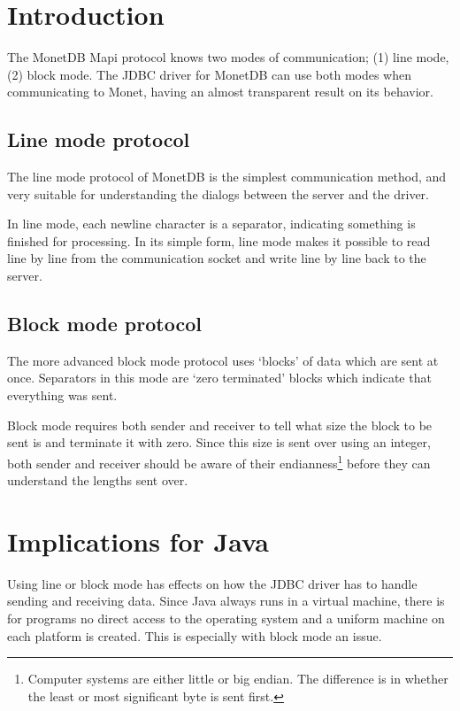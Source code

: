 \documentclass{article}
\begin{document}
\section{Introduction}

The MonetDB Mapi protocol knows two modes of communication;
(1) line mode, (2) block mode. The JDBC driver for MonetDB can
use both modes when communicating to Monet, having an almost
transparent result on its behavior.


\subsection{Line mode protocol}

The line mode protocol of MonetDB is the simplest communication
method, and very suitable for understanding the dialogs between
the server and the driver.

In line mode, each newline character is a separator, indicating
something is finished for processing. In its simple form, line mode
makes it possible to read line by line from the communication socket
and write line by line back to the server.


\subsection{Block mode protocol}

The more advanced block mode protocol uses `blocks' of data which
are sent at once. Separators in this mode are `zero terminated' blocks
which indicate that everything was sent.

Block mode requires both sender and receiver to tell what size the
block to be sent is and terminate it with zero. Since this size is sent
over using an integer, both sender and receiver should be aware of
their endianness\footnote{Computer systems are either little or big
endian. The difference is in whether the least or most significant byte
is sent first.} before they can understand the lengths sent over.


\section{Implications for Java}

Using line or block mode has effects on how the JDBC driver has to
handle sending and receiving data. Since Java always runs in a
virtual machine, there is for programs no direct access to the
operating system and a uniform machine on each platform is created.
This is especially with block mode an issue.
\end{document}

